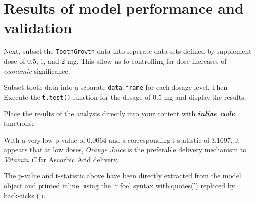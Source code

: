 \documentclass[12pt,oneside]{chicagocapstone}
\newenvironment{Shaded}{\begin{snugshade}}{\end{snugshade}}
\newcommand{\DataTypeTok}[1]{\textcolor[rgb]{0.13,0.29,0.53}{#1}}
\newcommand{\DecValTok}[1]{\textcolor[rgb]{0.00,0.00,0.81}{#1}}
\newcommand{\FloatTok}[1]{\textcolor[rgb]{0.00,0.00,0.81}{#1}}
\newcommand{\KeywordTok}[1]{\textcolor[rgb]{0.13,0.29,0.53}{\textbf{#1}}}
\newcommand{\NormalTok}[1]{#1}
\newcommand{\OperatorTok}[1]{\textcolor[rgb]{0.81,0.36,0.00}{\textbf{#1}}}
\newcommand{\StringTok}[1]{\textcolor[rgb]{0.31,0.60,0.02}{#1}}
\begin{document}
\hypertarget{results-of-model-performance-and-validation}{%
\section*{Results of model performance and validation}\label{results-of-model-performance-and-validation}}

Next, subset the \texttt{ToothGrowth} data into seperate data sets defined by supplement dose of 0.5, 1, and 2 mg. This allow us to controlling for dose increases of \emph{economic} significance.

Subset tooth data into a separate \texttt{data.frame} for each dosage level. Then Execute the \texttt{t.test()} function for the dosage of 0.5 mg and display the results.
\begin{Shaded}
\end{Shaded}
Place the results of the analysis directly into your content with \textbf{\emph{inline code}} functions:

With a very low p-value of 0.0064 and a corresponding t-statistic of 3.1697, it appears that at low doses, \emph{Orange Juice} is the preferable delivery mechanism to \emph{Vitamin C} for Ascorbic Acid delivery.

The p-value and t-statistic above have been directly extracted from the model object and printed inline. using the `r foo' syntax with quotes(') replaced by back-ticks (`).
\end{document}
